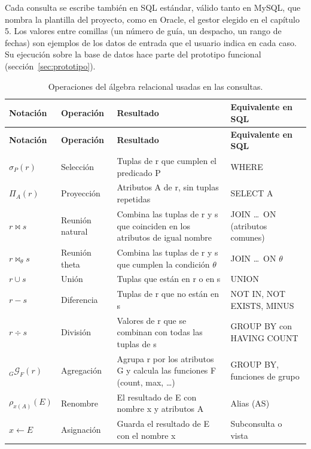 Cada consulta se escribe también en SQL estándar, válido tanto en
MySQL, que nombra la plantilla del proyecto, como en Oracle, el gestor
elegido en el capítulo 5. Los valores entre comillas (un número de
guía, un despacho, un rango de fechas) son ejemplos de los datos de
entrada que el usuario indica en cada caso. Su ejecución sobre la base
de datos hace parte del prototipo funcional
(sección~\ref{sec:prototipo}).

{\singlespacing\small
\begin{longtable}{L{2.4cm} L{2.4cm} L{5.6cm} L{4.0cm}}
\caption{Operaciones del álgebra relacional usadas en las consultas.}
\label{tab:operadores}\\
\toprule
\textbf{Notación} & \textbf{Operación} & \textbf{Resultado} & \textbf{Equivalente en SQL} \\
\midrule
\endfirsthead
\toprule
\textbf{Notación} & \textbf{Operación} & \textbf{Resultado} & \textbf{Equivalente en SQL} \\
\midrule
\endhead
\bottomrule
\endfoot
$\sigma_{P}(r)$ & Selección & Tuplas de r que cumplen el predicado P & WHERE \\
$\Pi_{A}(r)$ & Proyección & Atributos A de r, sin tuplas repetidas & SELECT A \\
$r \bowtie s$ & Reunión natural & Combina las tuplas de r y s que coinciden en los atributos de igual nombre & JOIN \dots\ ON (atributos comunes) \\
$r \bowtie_{\theta} s$ & Reunión theta & Combina las tuplas de r y s que cumplen la condición $\theta$ & JOIN \dots\ ON $\theta$ \\
$r \cup s$ & Unión & Tuplas que están en r o en s & UNION \\
$r - s$ & Diferencia & Tuplas de r que no están en s & NOT IN, NOT EXISTS, MINUS \\
$r \div s$ & División & Valores de r que se combinan con todas las tuplas de s & GROUP BY con HAVING COUNT \\
$_{G}\mathcal{G}_{F}(r)$ & Agregación & Agrupa r por los atributos G y calcula las funciones F (count, max, \dots) & GROUP BY, funciones de grupo \\
$\rho_{x(A)}(E)$ & Renombre & El resultado de E con nombre x y atributos A & Alias (AS) \\
$x \leftarrow E$ & Asignación & Guarda el resultado de E con el nombre x & Subconsulta o vista \\
\end{longtable}
\par}

